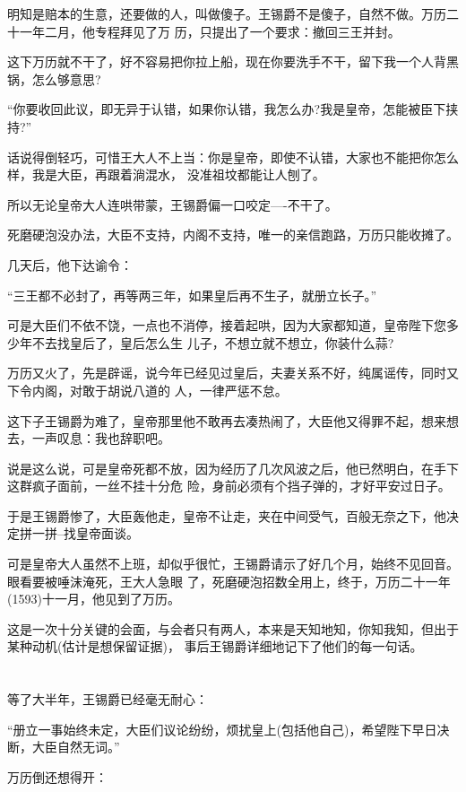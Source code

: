 \documentclass[11pt,a4paper,onecolumn]{article}
\begin{document}
明知是赔本的生意，还要做的人，叫做傻子。王锡爵不是傻子，自然不做。万历二十一年二月，他专程拜见了万
历，只提出了一个要求：撤回三王并封。

这下万历就不干了，好不容易把你拉上船，现在你要洗手不干，留下我一个人背黑锅，怎么够意思?

``你要收回此议，即无异于认错，如果你认错，我怎么办?我是皇帝，怎能被臣下挟持?''

话说得倒轻巧，可惜王大人不上当：你是皇帝，即使不认错，大家也不能把你怎么样，我是大臣，再跟着淌混水，
没准祖坟都能让人刨了。

所以无论皇帝大人连哄带蒙，王锡爵偏一口咬定----不干了。

死磨硬泡没办法，大臣不支持，内阁不支持，唯一的亲信跑路，万历只能收摊了。

几天后，他下达谕令：

``三王都不必封了，再等两三年，如果皇后再不生子，就册立长子。''

可是大臣们不依不饶，一点也不消停，接着起哄，因为大家都知道，皇帝陛下您多少年不去找皇后了，皇后怎么生
儿子，不想立就不想立，你装什么蒜?

万历又火了，先是辟谣，说今年已经见过皇后，夫妻关系不好，纯属谣传，同时又下令内阁，对敢于胡说八道的
人，一律严惩不怠。

这下子王锡爵为难了，皇帝那里他不敢再去凑热闹了，大臣他又得罪不起，想来想去，一声叹息：我也辞职吧。

说是这么说，可是皇帝死都不放，因为经历了几次风波之后，他已然明白，在手下这群疯子面前，一丝不挂十分危
险，身前必须有个挡子弹的，才好平安过日子。

于是王锡爵惨了，大臣轰他走，皇帝不让走，夹在中间受气，百般无奈之下，他决定拼一拼--找皇帝面谈。

可是皇帝大人虽然不上班，却似乎很忙，王锡爵请示了好几个月，始终不见回音。眼看要被唾沫淹死，王大人急眼
了，死磨硬泡招数全用上，终于，万历二十一年(1593)十一月，他见到了万历。

这是一次十分关键的会面，与会者只有两人，本来是天知地知，你知我知，但出于某种动机(估计是想保留证据)，
事后王锡爵详细地记下了他们的每一句话。

\section[\thesection]{}

等了大半年，王锡爵已经毫无耐心：

``册立一事始终未定，大臣们议论纷纷，烦扰皇上(包括他自己)，希望陛下早日决断，大臣自然无词。''

万历倒还想得开：
\end{document}
